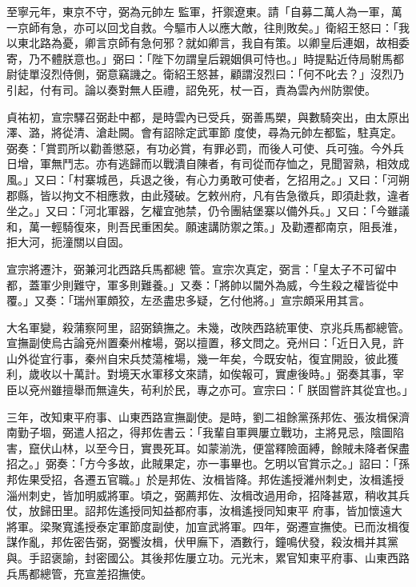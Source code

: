 \begin{pinyinscope}
 至寧元年，東京不守，弼為元帥左
 監軍，扞禦遼東。請「自募二萬人為一軍，萬一京師有急，亦可以回戈自救。今驅市人以應大敵，往則敗矣。」衛紹王怒曰：「我以東北路為憂，卿言京師有急何邪？就如卿言，我自有策。以卿皇后連姻，故相委寄，乃不體朕意也。」弼曰：「陛下勿謂皇后親姻俱可恃也。」時提點近侍局駙馬都尉徒單沒烈侍側，弼意竊譏之。衛紹王怒甚，顧謂沒烈曰：「何不叱去？」沒烈乃引起，付有司。論以奏對無人臣禮，詔免死，杖一百，責為雲內州防禦使。



 貞祐初，宣宗驛召弼赴中都，是時雲內已受兵，弼善馬槊，與數騎突出，由太原出澤、潞，將從清、滄赴闕。會有詔除定武軍節
 度使，尋為元帥左都監，駐真定。弼奏：「賞罰所以勸善懲惡，有功必賞，有罪必罰，而後人可使、兵可強。今外兵日增，軍無鬥志。亦有逃歸而以戰潰自陳者，有司從而存恤之，見聞習熟，相效成風。」又曰：「村寨城邑，兵退之後，有心力勇敢可使者，乞招用之。」又曰：「河朔郡縣，皆以拘文不相應救，由此殘破。乞敕州府，凡有告急徵兵，即須赴救，違者坐之。」又曰：「河北軍器，乞權宜弛禁，仍令團結堡寨以備外兵。」又曰：「今雖議和，萬一輕騎復來，則吾民重困矣。願速講防禦之策。」及勸遷都南京，阻長淮，拒大河，扼潼關以自固。



 宣宗將遷汴，弼兼河北西路兵馬都總
 管。宣宗次真定，弼言：「皇太子不可留中都，蓋軍少則難守，軍多則難養。」又奏：「將帥以閫外為威，今生殺之權皆從中覆。」又奏：「瑞州軍頗狡，左丞盡忠多疑，乞付他將。」宣宗頗采用其言。



 大名軍變，殺蒲察阿里，詔弼鎮撫之。未幾，改陜西路統軍使、京兆兵馬都總管。宣撫副使烏古論兗州置秦州榷場，弼以擅置，移文問之。兗州曰：「近日入見，許山外從宜行事，秦州自宋兵焚蕩榷場，幾一年矣，今既安帖，復宜開設，彼此獲利，歲收以十萬計。對境天水軍移文來請，如俟報可，實慮後時。」弼奏其事，宰臣以兗州雖擅舉而無違失，茍利於民，專之亦可。宣宗曰：「
 朕固嘗許其從宜也。」



 三年，改知東平府事、山東西路宣撫副使。是時，劉二祖餘黨孫邦佐、張汝楫保濟南勤子堌，弼遣人招之，得邦佐書云：「我輩自軍興屢立戰功，主將見忌，陰圖陷害，竄伏山林，以至今日，實畏死耳。如蒙湔洗，便當釋險面縛，餘賊未降者保盡招之。」弼奏：「方今多故，此賊果定，亦一事畢也。乞明以官賞示之。」詔曰：「孫邦佐果受招，各遷五官職。」於是邦佐、汝楫皆降。邦佐遙授濰州刺史，汝楫遙授淄州刺史，皆加明威將軍。頃之，弼薦邦佐、汝楫改過用命，招降甚眾，稍收其兵仗，放歸田里。詔邦佐遙授同知益都府事，汝楫遙授同知東平
 府事，皆加懷遠大將軍。梁聚寬遙授泰定軍節度副使，加宣武將軍。四年，弼遷宣撫使。已而汝楫復謀作亂，邦佐密告弼，弼饗汝楫，伏甲廡下，酒數行，鐘鳴伏發，殺汝楫并其黨與。手詔褒諭，封密國公。其後邦佐屢立功。元光末，累官知東平府事、山東西路兵馬都總管，充宣差招撫使。




\end{pinyinscope}
